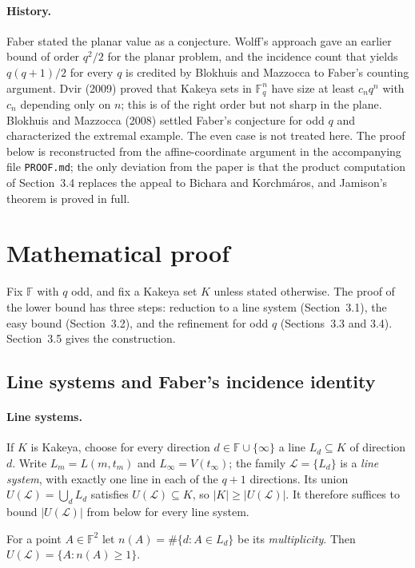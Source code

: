 \documentclass[11pt,a4paper]{article}
\theoremstyle{definition}
\theoremstyle{remark}
\newcommand{\F}{\mathbb{F}}
\newcommand{\Lset}{\mathcal{L}}
\begin{document}
\paragraph{History.} Faber stated the planar value as a conjecture. Wolff's approach gave an
earlier bound of order $q^2/2$ for the planar problem, and the incidence count that yields
$q(q+1)/2$ for every $q$ is credited by Blokhuis and Mazzocca to Faber's counting argument. Dvir
(2009) proved that Kakeya sets in $\F_q^n$ have size at least $c_n q^n$ with $c_n$ depending only on
$n$; this is of the right order but not sharp in the plane. Blokhuis and Mazzocca (2008) settled
Faber's conjecture for odd $q$ and characterized the extremal example. The even case is not
treated here. The proof below is reconstructed from the affine-coordinate argument in the
accompanying file \texttt{PROOF.md}; the only deviation from the paper is that the product
computation of Section~3.4 replaces the appeal to Bichara and Korchm\'aros, and Jamison's theorem is
proved in full.

\section{Mathematical proof}

Fix $\F$ with $q$ odd, and fix a Kakeya set $K$ unless stated otherwise. The proof of the lower
bound has three steps: reduction to a line system (Section~3.1), the easy bound (Section~3.2), and
the refinement for odd $q$ (Sections~3.3 and 3.4). Section~3.5 gives the construction.

\subsection{Line systems and Faber's incidence identity}

\paragraph{Line systems.} If $K$ is Kakeya, choose for every direction $d\in\F\cup\{\infty\}$ a
line $L_d\subseteq K$ of direction $d$. Write $L_m=L(m,t_m)$ and $L_\infty=V(t_\infty)$; the family
$\Lset=\{L_d\}$ is a \emph{line system}, with exactly one line in each of the $q+1$ directions. Its
union $U(\Lset)=\bigcup_d L_d$ satisfies $U(\Lset)\subseteq K$, so $|K|\ge|U(\Lset)|$. It therefore
suffices to bound $|U(\Lset)|$ from below for every line system.

For a point $A\in\F^2$ let $n(A)=\#\{d: A\in L_d\}$ be its \emph{multiplicity}. Then
$U(\Lset)=\{A: n(A)\ge 1\}$.
\end{document}
